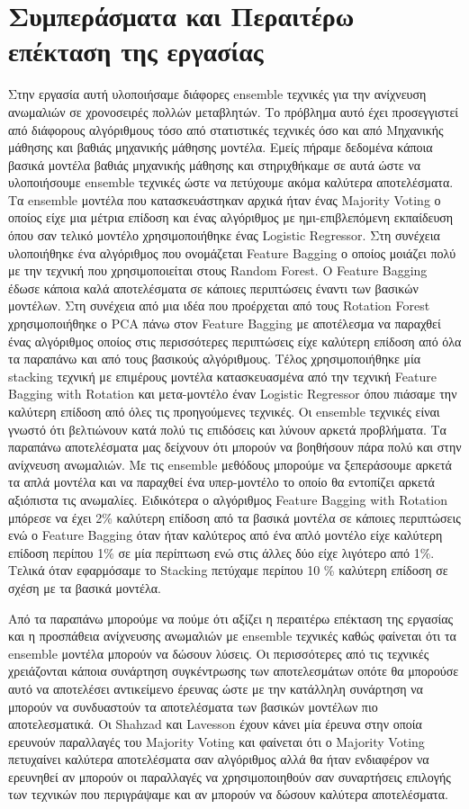 \documentclass[a4paper,12pt]{report}
\theoremstyle{definitionNODot}
\begin{document}
	\section{Συμπεράσματα και Περαιτέρω επέκταση της εργασίας}
	Στην εργασία αυτή υλοποιήσαμε διάφορες ensemble τεχνικές για την ανίχνευση ανωμαλιών σε χρονοσειρές πολλών μεταβλητών. Το πρόβλημα αυτό έχει προσεγγιστεί από διάφορους αλγόριθμους τόσο από στατιστικές τεχνικές όσο και από Μηχανικής μάθησης και βαθιάς μηχανικής μάθησης μοντέλα. Εμείς πήραμε δεδομένα κάποια βασικά μοντέλα βαθιάς μηχανικής μάθησης και στηριχθήκαμε σε αυτά ώστε να υλοποιήσουμε ensemble τεχνικές ώστε να πετύχουμε ακόμα καλύτερα αποτελέσματα. Τα ensemble μοντέλα που κατασκευάστηκαν αρχικά ήταν ένας Majority Voting ο οποίος είχε μια μέτρια επίδοση και ένας αλγόριθμος με ημι-επιβλεπόμενη εκπαίδευση όπου σαν τελικό μοντέλο χρησιμοποιήθηκε ένας Logistic Regressor. Στη συνέχεια υλοποιήθηκε ένα αλγόριθμος που ονομάζεται Feature Bagging ο οποίος μοιάζει πολύ με την τεχνική που χρησιμοποιείται στους Random Forest. Ο Feature Bagging έδωσε κάποια καλά αποτελέσματα σε κάποιες περιπτώσεις έναντι των βασικών μοντέλων. Στη συνέχεια από μια ιδέα που προέρχεται από τους Rotation Forest χρησιμοποιήθηκε ο PCA πάνω στον Feature Bagging με αποτέλεσμα να παραχθεί ένας αλγόριθμος οποίος στις περισσότερες περιπτώσεις είχε καλύτερη επίδοση από όλα τα παραπάνω και από τους βασικούς αλγόριθμους. Τέλος χρησιμοποιήθηκε μία stacking τεχνική με επιμέρους μοντέλα κατασκευασμένα από την τεχνική Feature Bagging with Rotation και μετα-μοντέλο έναν Logistic Regressor όπου πιάσαμε την καλύτερη επίδοση από όλες τις προηγούμενες τεχνικές. Οι ensemble τεχνικές είναι γνωστό ότι βελτιώνουν κατά πολύ τις επιδόσεις και λύνουν αρκετά προβλήματα. Τα παραπάνω αποτελέσματα μας δείχνουν ότι μπορούν να βοηθήσουν πάρα πολύ και στην ανίχνευση ανωμαλιών. Με τις ensemble μεθόδους μπορούμε να ξεπεράσουμε αρκετά τα απλά μοντέλα και να παραχθεί ένα υπερ-μοντέλο το οποίο θα εντοπίζει αρκετά αξιόπιστα τις ανωμαλίες. Ειδικότερα ο αλγόριθμος Feature Bagging with Rotation μπόρεσε να έχει 2\% καλύτερη επίδοση από τα βασικά μοντέλα σε κάποιες περιπτώσεις ενώ ο Feature Bagging όταν ήταν καλύτερος από ένα απλό μοντέλο είχε καλύτερη επίδοση περίπου 1\% σε μία περίπτωση ενώ στις άλλες δύο είχε λιγότερο από 1\%. Τελικά όταν εφαρμόσαμε το Stacking πετύχαμε περίπου 10 \% καλύτερη επίδοση σε σχέση με τα βασικά μοντέλα.
	
	Από τα παραπάνω μπορούμε να πούμε ότι αξίζει η περαιτέρω επέκταση της εργασίας και η προσπάθεια ανίχνευσης ανωμαλιών με ensemble τεχνικές καθώς φαίνεται ότι τα ensemble μοντέλα μπορούν να δώσουν λύσεις. Οι περισσότερες από τις τεχνικές χρειάζονται κάποια συνάρτηση συγκέντρωσης των αποτελεσμάτων οπότε θα μπορούσε αυτό να αποτελέσει αντικείμενο έρευνας ώστε με την κατάλληλη συνάρτηση να μπορούν να συνδυαστούν τα αποτελέσματα των βασικών μοντέλων πιο αποτελεσματικά. Οι Shahzad και Lavesson έχουν κάνει μία έρευνα \cite{shahzad2013comparative} στην οποία ερευνούν παραλλαγές του Majority Voting και φαίνεται ότι ο Majority Voting πετυχαίνει καλύτερα αποτελέσματα σαν αλγόριθμος αλλά θα ήταν ενδιαφέρον να ερευνηθεί αν μπορούν οι παραλλαγές να χρησιμοποιηθούν σαν συναρτήσεις επιλογής των τεχνικών που περιγράψαμε και αν μπορούν να δώσουν καλύτερα αποτελέσματα.
	
\end{document}
